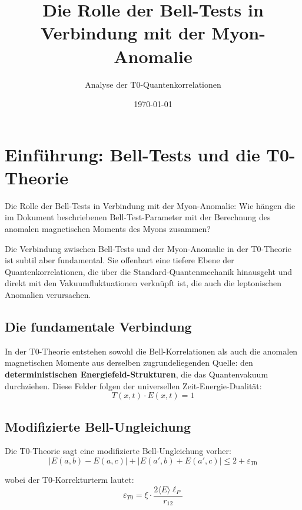 \documentclass[12pt,a4paper]{article}
\title{Die Rolle der Bell-Tests in Verbindung mit der Myon-Anomalie}
\author{Analyse der T0-Quantenkorrelationen}
\date{\today}
\begin{document}
	
	\maketitle
	
	\tableofcontents
	\newpage
	
	\section{Einf\"uhrung: Bell-Tests und die T0-Theorie}
	
	\begin{question}
		Die Rolle der Bell-Tests in Verbindung mit der Myon-Anomalie: Wie h\"angen die im Dokument beschriebenen Bell-Test-Parameter mit der Berechnung des anomalen magnetischen Moments des Myons zusammen?
	\end{question}
	
	
		Die Verbindung zwischen Bell-Tests und der Myon-Anomalie in der T0-Theorie ist subtil aber fundamental. Sie offenbart eine tiefere Ebene der Quantenkorrelationen, die \"uber die Standard-Quantenmechanik hinausgeht und direkt mit den Vakuumfluktuationen verkn\"upft ist, die auch die leptonischen Anomalien verursachen.
		
		\subsection{Die fundamentale Verbindung}
		
		In der T0-Theorie entstehen sowohl die Bell-Korrelationen als auch die anomalen magnetischen Momente aus derselben zugrundeliegenden Quelle: den \textbf{deterministischen Energiefeld-Strukturen}, die das Quantenvakuum durchziehen. Diese Felder folgen der universellen Zeit-Energie-Dualit\"at:
		\begin{equation}
			T(x,t) \cdot E(x,t) = 1
		\end{equation}
		
		\subsection{Modifizierte Bell-Ungleichung}
		
		Die T0-Theorie sagt eine modifizierte Bell-Ungleichung vorher:
		\begin{equation}
			|E(a,b) - E(a,c)| + |E(a',b) + E(a',c)| \leq 2 + \varepsilon_{T0}
		\end{equation}
		
		wobei der T0-Korrekturterm lautet:
		\begin{equation}
			\varepsilon_{T0} = \xi \cdot \frac{2\langle E \rangle \ell_P}{r_{12}}
		\end{equation}
		
\end{document}
